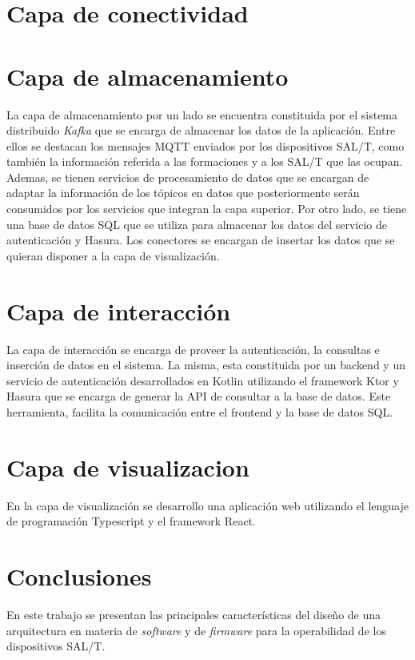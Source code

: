 \documentclass[10pt, a4paper, twocolumn]{article} %
\begin{document}
\section{Capa de conectividad}

\section{Capa de almacenamiento}

La capa de almacenamiento por un lado se encuentra constituida por el sistema distribuido \textit{Kafka} que se encarga
de almacenar los datos de la aplicación. Entre ellos se destacan los mensajes MQTT enviados
por los dispositivos SAL/T, como también la información referida a las formaciones y a los SAL/T que las ocupan. 
Ademas, se tienen servicios de procesamiento de datos que se encargan de adaptar la información de los tópicos en
datos que posteriormente serán consumidos por los servicios que integran la capa superior. Por otro lado,
se tiene una base de datos SQL que se utiliza para almacenar los datos del servicio de autenticación y 
Hasura. Los conectores se encargan de insertar los datos que se quieran disponer a la capa de 
visualización.

\section{Capa de interacción}

La capa de interacción se encarga de proveer la autenticación, la consultas e inserción de datos en el sistema.
La misma, esta constituida por un backend y un servicio de autenticación desarrollados en Kotlin utilizando el framework Ktor y
Hasura que se encarga de generar la API de consultar a la base de datos. Este herramienta, 
facilita la comunicación entre el frontend y la base de datos SQL. 

\section{Capa de visualizacion}

En la capa de visualización se desarrollo una aplicación web utilizando el lenguaje
de programación Typescript y el framework React.

\section{Conclusiones}

En este trabajo se presentan las principales características del diseño de una arquitectura en materia de \textit{software} y de \textit{firmware} para la operabilidad de los dispositivos SAL/T.
\end{document}
